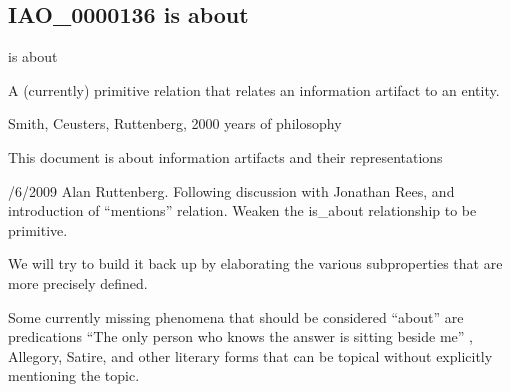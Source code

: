 \documentclass[letterpaper,10pt,english]{sphinxmanual}
\begin{document}
\subsection{IAO\_0000136 \sphinxhyphen{} is about}
\label{\detokenize{doc-IAO_0000136:iao-0000136-is-about}}\label{\detokenize{doc-IAO_0000136:index-0}}\label{\detokenize{doc-IAO_0000136::doc}}
\begin{sphinxShadowBox}

\sphinxAtStartPar
is about
\end{sphinxShadowBox}

\begin{sphinxShadowBox}

\sphinxAtStartPar
A (currently) primitive relation that relates an information artifact to an entity.
\end{sphinxShadowBox}

\begin{sphinxShadowBox}

\sphinxAtStartPar
Smith, Ceusters, Ruttenberg, 2000 years of philosophy
\end{sphinxShadowBox}

\begin{sphinxShadowBox}

\sphinxAtStartPar
This document is about information artifacts and their representations
\end{sphinxShadowBox}

\begin{sphinxShadowBox}

/6/2009 Alan Ruttenberg. Following discussion with Jonathan Rees, and introduction of “mentions” relation. Weaken the is\_about relationship to be primitive.

\sphinxAtStartPar
We will try to build it back up by elaborating the various subproperties that are more precisely defined.

\sphinxAtStartPar
Some currently missing phenomena that should be considered “about” are predications \sphinxhyphen{} “The only person who knows the answer is sitting beside me” , Allegory, Satire, and other literary forms that can be topical without explicitly mentioning the topic.
\end{sphinxShadowBox}

\begin{sphinxShadowBox}

\sphinxAtStartPar
{}
\end{sphinxShadowBox}
\end{document}
